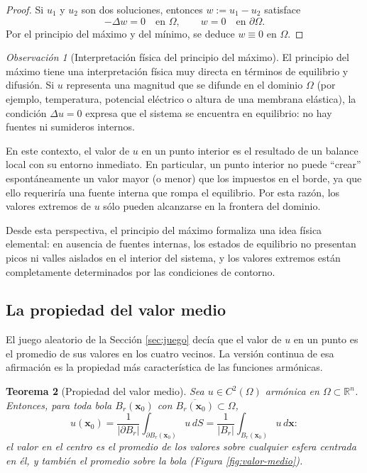 \documentclass[12pt, a4paper]{amsbook}
\newcommand{\R}{{\mathbb R}}
\newcommand{\xx}{{\mathbf x}}
\newtheorem{teo}{Teorema}[section]
\theoremstyle{remark}
\newtheorem{obs}[teo]{Observación}
\theoremstyle{definition}
\numberwithin{section}{chapter}
\numberwithin{subsection}{section}
\numberwithin{equation}{section}
\numberwithin{figure}{chapter}
\begin{document}
\begin{proof}
Si $u_1$ y $u_2$ son dos soluciones, entonces $w := u_1 - u_2$ satisface
\[
-\Delta w = 0 \quad \text{en } \Omega,
\qquad
w = 0 \quad \text{en } \partial \Omega.
\]
Por el principio del máximo y del mínimo, se deduce $w \equiv 0$ en $\Omega$.
\end{proof}

\begin{obs}[Interpretación física del principio del máximo]
El principio del máximo tiene una interpretación física muy directa en términos de equilibrio y difusión. 
Si $u$ representa una magnitud que se difunde en el dominio $\Omega$ (por ejemplo, temperatura, potencial eléctrico o altura de una membrana elástica), la condición $\Delta u = 0$ expresa que el sistema se encuentra en equilibrio: no hay fuentes ni sumideros internos.

En este contexto, el valor de $u$ en un punto interior es el resultado de un balance local con su entorno inmediato. En particular, un punto interior no puede ``crear'' espontáneamente un valor mayor (o menor) que los impuestos en el borde, ya que ello requeriría una fuente interna que rompa el equilibrio. 
Por esta razón, los valores extremos de $u$ sólo pueden alcanzarse en la frontera del dominio.

Desde esta perspectiva, el principio del máximo formaliza una idea física elemental: 
en ausencia de fuentes internas, los estados de equilibrio no presentan picos ni valles aislados en el interior del sistema, y los valores extremos están completamente determinados por las condiciones de contorno.
\end{obs}


\subsection{La propiedad del valor medio}

El juego aleatorio de la Sección \ref{sec:juego} decía que el valor de $u$ en un punto es el promedio de sus valores en los cuatro vecinos. La versión continua de esa afirmación es la propiedad más característica de las funciones armónicas.

\begin{teo}[Propiedad del valor medio]\label{teo:valor-medio}
Sea $u\in C^2(\Omega)$ armónica en $\Omega\subset\R^n$. Entonces, para toda bola $B_r(\xx_0)$ con $\overline{B_r(\xx_0)}\subset\Omega$,
$$
u(\xx_0) = \frac{1}{|\partial B_r|}\int_{\partial B_r(\xx_0)} u\, dS = \frac{1}{|B_r|}\int_{B_r(\xx_0)} u\, d\xx :
$$
el valor en el centro es el promedio de los valores sobre cualquier esfera centrada en él, y también el promedio sobre la bola (Figura \ref{fig:valor-medio}).
\end{teo}
\end{document}
